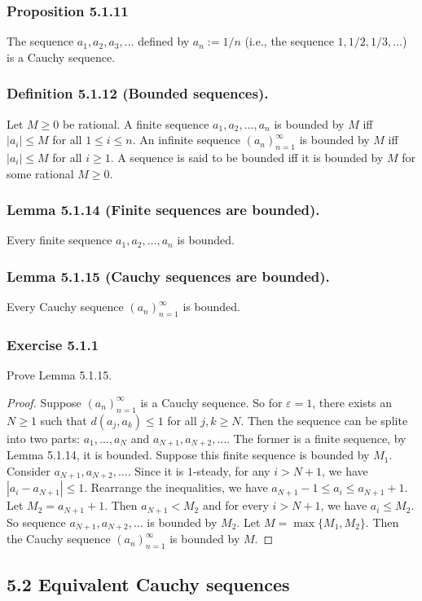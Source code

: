 \documentclass[12pt, letter]{article}
\begin{document}
\subsubsection*{Proposition 5.1.11}
The sequence $a_1,a_2,a_3,\dotsc$ defined by $a_n:=1/n$ (i.e., the sequence $1,1/2,1/3,\dotsc$) is a Cauchy sequence. 
\subsubsection*{Definition 5.1.12 (Bounded sequences).} 
Let $M\geq 0$ be rational. A finite sequence $a_1,a_2,\dotsc,a_n$ is bounded by $M$ iff $|a_i|\leq M$ for all $1\leq i\leq n$. An infinite sequence $(a_n)_{n=1}^\infty$
is bounded by $M$ iff $|a_i|\leq M$ for all $i\geq 1$. A sequence is said to be bounded iff it is bounded by $M$ for some rational $M\geq 0$.
\subsubsection*{Lemma 5.1.14 (Finite sequences are bounded).}
Every finite sequence $a_1,a_2,\dotsc, a_n$ is bounded.
\subsubsection*{Lemma 5.1.15 (Cauchy sequences are bounded).}
Every Cauchy sequence $(a_n)_{n=1}^\infty$ is bounded.
\subsubsection*{Exercise 5.1.1}
Prove Lemma 5.1.15.
\begin{proof}
    Suppose $(a_n)_{n=1}^\infty$ is a Cauchy sequence. So for $\varepsilon=1$, there exists an $N\geq 1$ such that $d(a_j,a_k)\leq 1$ for all
    $j,k\geq N$. Then the sequence can be splite into two parts: $a_1,\dotsc,a_N$ and $a_{N+1},a_{N+2},\dotsc$. The former is a finite sequence, by Lemma 5.1.14, 
    it is bounded. Suppose this finite sequence is bounded by $M_1$. Consider $a_{N+1},a_{N+2},\dotsc$. Since it is $1$-steady, for any $i>N+1$, we have 
    $|a_i-a_{N+1}|\leq 1$. Rearrange the inequalities, we have $a_{N+1}-1\leq a_i\leq a_{N+1}+1$. Let $M_2=a_{N+1}+1$. Then $a_{N+1}<M_2$ and for every $i>N+1$, we have 
    $a_i\leq M_2$. So sequence $a_{N+1},a_{N+2},\dotsc$ is bounded by $M_2$. Let $M=\max\{M_1,M_2\}$. Then the Cauchy sequence $(a_n)_{n=1}^\infty$
    is bounded by $M$. 
\end{proof}
\subsection*{5.2 Equivalent Cauchy sequences}
\end{document}
